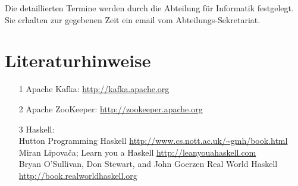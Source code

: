 Die detaillierten Termine werden durch die Abteilung für Informatik festgelegt.
Sie erhalten zur gegebenen Zeit ein email vom  Abteilungs-Sekretariat.

\section{Literaturhinweise}
\begin{itemize}
    \item [1] Apache Kafka: \url{http://kafka.apache.org}
    \item [2] Apache ZooKeeper: \url{http://zookeeper.apache.org}
    \item [3] Haskell: \\
           Hutton Programming Haskell
           \url{http://www.cs.nott.ac.uk/~gmh/book.html}\\
            Miran Lipovača; Learn you a Haskell
            \url{http://leanyouahaskell.com} \\
            Bryan O'Sullivan, Don Stewart, and John Goerzen  Real World Haskell 
            \url{http://book.realworldhaskell.org}
\end{itemize}

